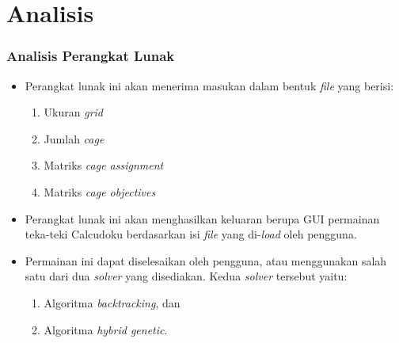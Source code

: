 \documentclass{beamer}
\begin{document}

\section{Analisis}

\begin{frame}
\frametitle{Analisis Perangkat Lunak}
\begin{itemize}
\item Perangkat lunak ini akan menerima masukan dalam bentuk \textit{file} yang berisi:
	\begin{enumerate}
	\item Ukuran \textit{grid}
	\item Jumlah \textit{cage}
	\item Matriks \textit{cage assignment}
	\item Matriks \textit{cage objectives}
\end{enumerate}
\item Perangkat lunak ini akan menghasilkan keluaran berupa GUI permainan teka-teki Calcudoku berdasarkan isi \textit{file} yang di-\textit{load} oleh pengguna.
\item Permainan ini dapat diselesaikan oleh pengguna, atau menggunakan salah satu dari dua \textit{solver} yang disediakan. Kedua \textit{solver} tersebut yaitu:
	\begin{enumerate}
	\item Algoritma \textit{backtracking}, dan
	\item Algoritma \textit{hybrid genetic}.
	\end{enumerate}
\end{itemize}
\end{frame}
\end{document}
